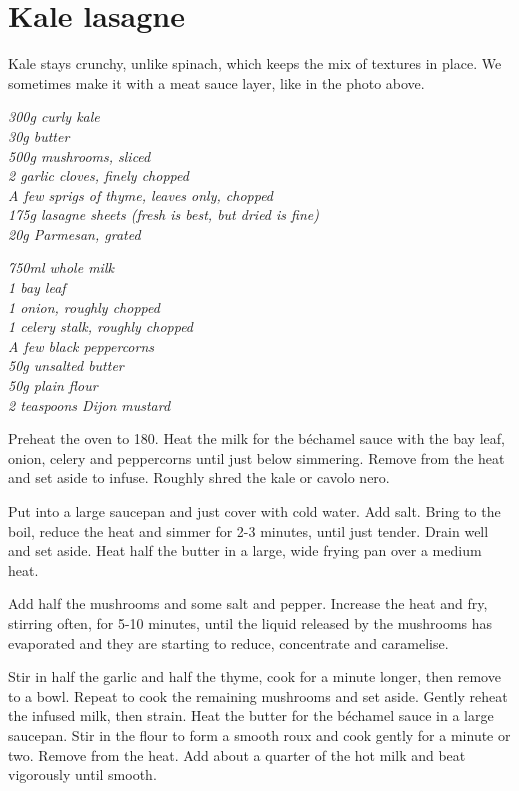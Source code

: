 \documentclass{tufte-book}
\begin{document}
\section{Kale lasagne}

Kale stays crunchy, unlike spinach, which keeps the mix of textures in place. We sometimes make it with a meat sauce layer, like in the photo above.


\emph{300g curly kale
\\30g butter
\\500g mushrooms, sliced
\\2 garlic cloves, finely chopped
\\A few sprigs of thyme, leaves only, chopped
\\175g lasagne sheets (fresh is best, but dried is fine)
\\20g Parmesan, grated
}

\newpage


\emph{750ml whole milk
\\1 bay leaf
\\1 onion, roughly chopped
\\1 celery stalk, roughly chopped
\\A few black peppercorns
\\50g unsalted butter
\\50g plain flour
\\2 teaspoons Dijon mustard
}

\smallskip
Preheat the oven to 180\celsius. Heat the milk for the b\'echamel sauce with the bay leaf, onion, celery and peppercorns until just below simmering. Remove from the heat and set aside to infuse. Roughly shred the kale or cavolo nero.

Put into a large saucepan and just cover with cold water. Add salt. Bring to the boil, reduce the heat and simmer for 2-3 minutes, until just tender. Drain well and set aside. Heat half the butter in a large, wide frying pan over a medium heat.

Add half the mushrooms and some salt and pepper. Increase the heat and fry, stirring often, for 5-10 minutes, until the liquid released by the mushrooms has evaporated and they are starting to reduce, concentrate and caramelise.

Stir in half the garlic and half the thyme, cook for a minute longer, then remove to a bowl. Repeat to cook the remaining mushrooms and set aside. Gently reheat the infused milk, then strain. Heat the butter for the b\'echamel sauce in a large saucepan. Stir in the flour to form a smooth roux and cook gently for a minute or two. Remove from the heat. Add about a quarter of the hot milk and beat vigorously until smooth.
\end{document}
